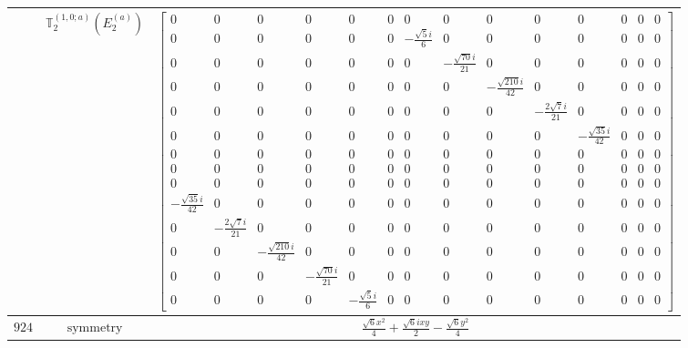 \documentclass[fleqn,8pt,landscape]{jsarticle}
\begin{document}
\begin{longtable}{ccc}
$  $ & $ \mathbb{T}_{2}^{(1,0;a)}(E_{2}^{(a)}) $ & $ \begin{bmatrix} 0 & 0 & 0 & 0 & 0 & 0 & 0 & 0 & 0 & 0 & 0 & 0 & 0 & 0 \\ 0 & 0 & 0 & 0 & 0 & 0 & - \frac{\sqrt{5} i}{6} & 0 & 0 & 0 & 0 & 0 & 0 & 0 \\ 0 & 0 & 0 & 0 & 0 & 0 & 0 & - \frac{\sqrt{70} i}{21} & 0 & 0 & 0 & 0 & 0 & 0 \\ 0 & 0 & 0 & 0 & 0 & 0 & 0 & 0 & - \frac{\sqrt{210} i}{42} & 0 & 0 & 0 & 0 & 0 \\ 0 & 0 & 0 & 0 & 0 & 0 & 0 & 0 & 0 & - \frac{2 \sqrt{7} i}{21} & 0 & 0 & 0 & 0 \\ 0 & 0 & 0 & 0 & 0 & 0 & 0 & 0 & 0 & 0 & - \frac{\sqrt{35} i}{42} & 0 & 0 & 0 \\ 0 & 0 & 0 & 0 & 0 & 0 & 0 & 0 & 0 & 0 & 0 & 0 & 0 & 0 \\ 0 & 0 & 0 & 0 & 0 & 0 & 0 & 0 & 0 & 0 & 0 & 0 & 0 & 0 \\ 0 & 0 & 0 & 0 & 0 & 0 & 0 & 0 & 0 & 0 & 0 & 0 & 0 & 0 \\ - \frac{\sqrt{35} i}{42} & 0 & 0 & 0 & 0 & 0 & 0 & 0 & 0 & 0 & 0 & 0 & 0 & 0 \\ 0 & - \frac{2 \sqrt{7} i}{21} & 0 & 0 & 0 & 0 & 0 & 0 & 0 & 0 & 0 & 0 & 0 & 0 \\ 0 & 0 & - \frac{\sqrt{210} i}{42} & 0 & 0 & 0 & 0 & 0 & 0 & 0 & 0 & 0 & 0 & 0 \\ 0 & 0 & 0 & - \frac{\sqrt{70} i}{21} & 0 & 0 & 0 & 0 & 0 & 0 & 0 & 0 & 0 & 0 \\ 0 & 0 & 0 & 0 & - \frac{\sqrt{5} i}{6} & 0 & 0 & 0 & 0 & 0 & 0 & 0 & 0 & 0 \end{bmatrix} $ \\ \hline
$ 924 $ & $ \text{symmetry} $ & $ \frac{\sqrt{6} x^{2}}{4} + \frac{\sqrt{6} i x y}{2} - \frac{\sqrt{6} y^{2}}{4} $ \\

\end{longtable}
\end{document}
